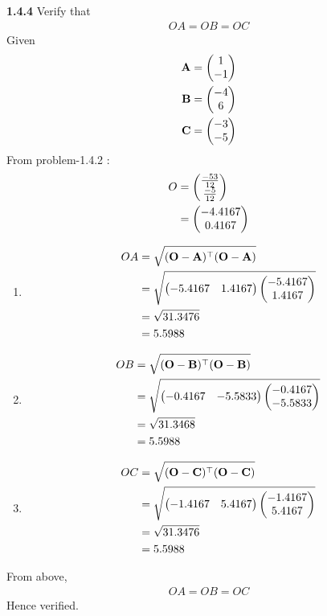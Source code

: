 \documentclass{article}
\begin{document}
\let\vec\mathbf
\maketitle
\noindent \textbf{1.4.4} Verify that
\begin{align}
OA = OB = OC
\end{align}
\solution
Given \begin{align}
\vec{A} &= \myvec{1\\-1}\\
\vec{B} &= \myvec{-4\\6}\\
\vec{C} &= \myvec{-3\\-5}
\end{align}
From problem-1.4.2 :
\begin{align}
O &= \begin{pmatrix}\frac{-53}{12} \\ \frac{-5}{12}\end{pmatrix}\\
 &= \begin{pmatrix}-4.4167\\ 0.4167\end{pmatrix}
\end{align}
\begin{enumerate}
\item 
\begin{align}
OA &= \sqrt{(\vec{O}-\vec{A})^{\top}(\vec{O}-\vec{A})}\\
&= \sqrt{\myvec{-5.4167 & 1.4167} \myvec{-5.4167\\1.4167}}\\
 &= \sqrt{31.3476}\\
 &= 5.5988
\end{align}
\item 
\begin{align}
OB &= \sqrt{(\vec{O}-\vec{B})^{\top}(\vec{O}-\vec{B})}\\
 &= \sqrt{\myvec{-0.4167 & -5.5833} \myvec{-0.4167\\-5.5833}}\\
 &= \sqrt{31.3468}\\
 &= 5.5988
\end{align}
\item 
\begin{align}
OC &= \sqrt{(\vec{O}-\vec{C})^{\top}(\vec{O}-\vec{C})}\\
 &= \sqrt{\myvec{-1.4167 & 5.4167}  \myvec{-1.4167\\5.4167}}\\
&= \sqrt{31.3476}\\
 &= 5.5988
\end{align}
\end{enumerate}
From above, 
\begin{align}
OA = OB = OC
\end{align}
Hence verified.
\end{document}
